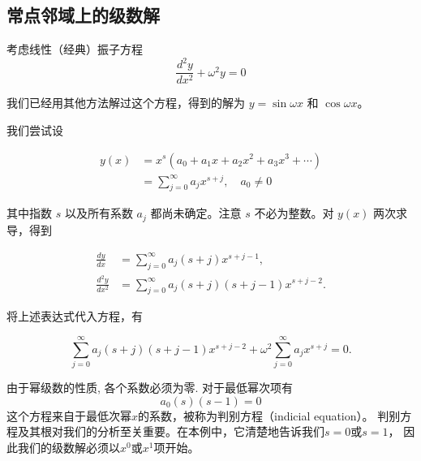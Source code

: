 \subsection{常点邻域上的级数解}

考虑线性（经典）振子方程
$$
\frac{d^2 y}{d x^2}+\omega^2 y=0
$$

我们已经用其他方法解过这个方程，得到的解为 $y=\sin \omega x$ 和 $\cos \omega x$。

我们尝试设

$$
\begin{aligned}
y(x) & =x^s\left(a_0+a_1 x+a_2 x^2+a_3 x^3+\cdots\right) \\
& =\sum_{j=0}^{\infty} a_j x^{s+j}, \quad a_0 \neq 0
\end{aligned}
$$

其中指数 $s$ 以及所有系数 $a_j$ 都尚未确定。注意 $s$ 不必为整数。对 $y(x)$ 两次求导，得到

$$
\begin{aligned}
\frac{d y}{d x} & =\sum_{j=0}^{\infty} a_j(s+j) x^{s+j-1}, \\
\frac{d^2 y}{d x^2} & =\sum_{j=0}^{\infty} a_j(s+j)(s+j-1) x^{s+j-2} .
\end{aligned}
$$

将上述表达式代入方程，有

$$
\sum_{j=0}^{\infty} a_j(s+j)(s+j-1) x^{s+j-2}+\omega^2 \sum_{j=0}^{\infty} a_j x^{s+j}=0 .
$$







由于幂级数的性质, 各个系数必须为零.
对于最低幂次项有
$$
 a_0(s)(s-1)=0 
$$
这个方程来自于最低次幂$x$的系数，被称为判别方程（indicial equation）。
判别方程及其根对我们的分析至关重要。在本例中，它清楚地告诉我们$s=0$或$s=1$，
因此我们的级数解必须以$x^0$或$x^1$项开始。

